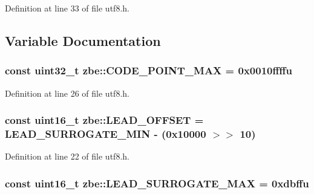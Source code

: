 Definition at line 33 of file utf8.\+h.



\subsection{Variable Documentation}
\hypertarget{namespacezbe_a22d672605de5842ffd69d3f0741c85fa}{}
\subsubsection[{C\+O\+D\+E\+\_\+\+P\+O\+I\+N\+T\+\_\+\+M\+A\+X}]{\setlength{\rightskip}{0pt plus 5cm}const uint32\+\_\+t zbe\+::\+C\+O\+D\+E\+\_\+\+P\+O\+I\+N\+T\+\_\+\+M\+A\+X = 0x0010ffffu}\label{namespacezbe_a22d672605de5842ffd69d3f0741c85fa}


Definition at line 26 of file utf8.\+h.

\hypertarget{namespacezbe_a6402cf0e195d586a56e170600d540e11}{}
\subsubsection[{L\+E\+A\+D\+\_\+\+O\+F\+F\+S\+E\+T}]{\setlength{\rightskip}{0pt plus 5cm}const uint16\+\_\+t zbe\+::\+L\+E\+A\+D\+\_\+\+O\+F\+F\+S\+E\+T = {\bf L\+E\+A\+D\+\_\+\+S\+U\+R\+R\+O\+G\+A\+T\+E\+\_\+\+M\+I\+N} -\/ (0x10000 $>$$>$ 10)}\label{namespacezbe_a6402cf0e195d586a56e170600d540e11}


Definition at line 22 of file utf8.\+h.

\hypertarget{namespacezbe_a834003cf73290548f7010b40b160a329}{}
\subsubsection[{L\+E\+A\+D\+\_\+\+S\+U\+R\+R\+O\+G\+A\+T\+E\+\_\+\+M\+A\+X}]{\setlength{\rightskip}{0pt plus 5cm}const uint16\+\_\+t zbe\+::\+L\+E\+A\+D\+\_\+\+S\+U\+R\+R\+O\+G\+A\+T\+E\+\_\+\+M\+A\+X = 0xdbffu}\label{namespacezbe_a834003cf73290548f7010b40b160a329}


